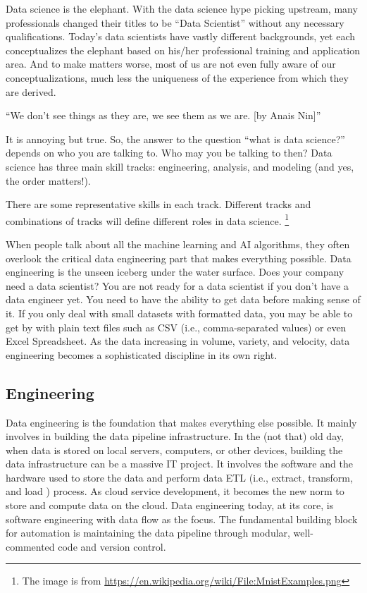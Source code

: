 \documentclass[
  12pt,
]{krantz}
\renewenvironment{quote}{\begin{VF}}{\end{VF}}
\begin{document}
Data science is the elephant. With the data science hype picking upstream, many professionals changed their titles to be ``Data Scientist'' without any necessary qualifications. Today's data scientists have vastly different backgrounds, yet each conceptualizes the elephant based on his/her professional training and application area. And to make matters worse, most of us are not even fully aware of our conceptualizations, much less the uniqueness of the experience from which they are derived.

\begin{quote}
``We don't see things as they are, we see them as we are. {[}by Anais Nin{]}''
\end{quote}

It is annoying but true. So, the answer to the question ``what is data science?'' depends on who you are talking to. Who may you be talking to then? Data science has three main skill tracks: engineering, analysis, and modeling (and yes, the order matters!).

There are some representative skills in each track. Different tracks and combinations of tracks will define different roles in data science. \footnote{The image is from \url{https://en.wikipedia.org/wiki/File:MnistExamples.png}}

When people talk about all the machine learning and AI algorithms, they often overlook the critical data engineering part that makes everything possible. Data engineering is the unseen iceberg under the water surface. Does your company need a data scientist? You are not ready for a data scientist if you don't have a data engineer yet. You need to have the ability to get data before making sense of it. If you only deal with small datasets with formatted data, you may be able to get by with plain text files such as CSV (i.e., comma-separated values) or even Excel Spreadsheet. As the data increasing in volume, variety, and velocity, data engineering becomes a sophisticated discipline in its own right.

\hypertarget{engineering}{%
\subsection{Engineering}\label{engineering}}

Data engineering is the foundation that makes everything else possible. It mainly involves in building the data pipeline infrastructure. In the (not that) old day, when data is stored on local servers, computers, or other devices, building the data infrastructure can be a massive IT project. It involves the software and the hardware used to store the data and perform data ETL  (i.e., extract, transform, and load ) process. As cloud service development, it becomes the new norm to store and compute data on the cloud. Data engineering today, at its core, is software engineering with data flow as the focus. The fundamental building block for automation is maintaining the data pipeline through modular, well-commented code and version control.
\end{document}
